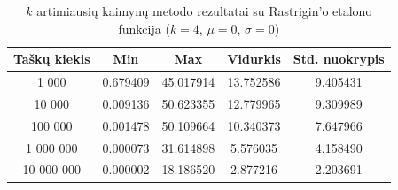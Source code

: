 \begin{table}[H]
    \centering
    \begin{tabular}{|c|c|c|c|c|}
        \hline
        \textbf{Taškų kiekis} & \textbf{Min} & \textbf{Max} & \textbf{Vidurkis} & \textbf{Std. nuokrypis} \\ \hline
        1 000        & 0.679409 & 45.017914 & 13.752586 & 9.405431 \\ \hline
        10 000       & 0.009136 & 50.623355 & 12.779965 & 9.309989 \\ \hline
        100 000      & 0.001478 & 50.109664 & 10.340373 & 7.647966 \\ \hline
        1 000 000    & 0.000073 & 31.614898 & 5.576035 & 4.158490 \\ \hline
        10 000 000   & 0.000002 & 18.186520 & 2.877216 & 2.203691 \\ \hline
    \end{tabular}
    \caption{$k$ artimiausių kaimynų metodo rezultatai su Rastrigin'o etalono funkcija ($k = 4$, $\mu = 0$, $\sigma = 0$)}
\end{table}